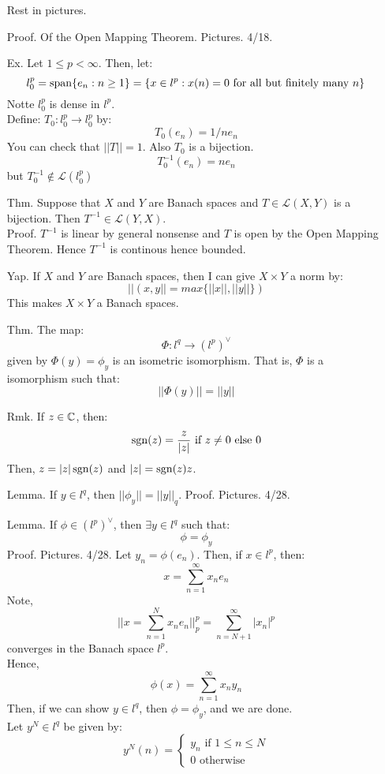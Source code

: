 \documentclass[12pt]{article}
\begin{document}
\begin{itemize}
    Rest in pictures.
    \item[Proof.] Of the Open Mapping Theorem. Pictures. 4/18.
    \item[Ex.] Let $1 \leq p < \infty$. Then, let: 
    \[ l_0^p = \operatorname{span}\{e_n : n \geq 1\} = \{x \in l^p: x(n) = 0 \text{ for all but finitely many $n$}\}\]
    Notte $l_0^p$ is dense in $l^p$. \\
    Define: $T_0: l_0^p \to l_0^p$ by:
    \[T_0(e_n) = 1/n e_n\]
    You can check that $||T|| = 1$. Also $T_0$ is a bijection. 
    \[T_0^{-1}(e_n) = ne_n\]
    but $T_0^{-1} \not\in \mathcal{L}(l_0^p)$
    \item[Thm.] Suppose that $X$ and $Y$ are Banach spaces and $T \in \mathcal{L}(X,Y)$ is a bijection. Then $T^{-1} \in \mathcal{L}(Y,X)$. \\
    Proof. $T^{-1}$ is linear by general nonsense and $T$ is open by the Open Mapping Theorem. Hence $T^{-1}$ is continous hence bounded.
    \item[Yap.] If $X$ and $Y$ are Banach spaces, then I can give $X \times Y$ a norm by: 
    \[ ||(x,y|| = max\{||x||, ||y||\})\]
    This makes $X \times Y$ a Banach spaces.
    \newpage 
    \item[Thm.] The map:
    \[ \Phi: l^q \to (l^p)^\vee \]
    given by $\Phi(y) = \phi_y$ is an isometric isomorphism. That is, $\Phi$ is a isomorphism such that:
    \[ ||\Phi(y)|| = ||y|| \]
    \item[Rmk.] If $z \in \mathbb C$, then: 
    \[ \operatorname{sgn}(z) = \frac{z}{|z|} \text{ if } z \neq 0 \text{ else } 0 \]
    Then, $z = |z| \operatorname{sgn}(z)$ and $|z| = \operatorname{sgn}(z) z$.
    \item[Lemma.] If $y \in l^q$, then $||\phi_y|| = ||y||_q$.   
    Proof. Pictures. 4/28.
    \item[Lemma.] If $\phi \in (l^p)^\vee$, then $\exists y \in l^q$ such that:
    \[ \phi = \phi_y\]
    Proof. Pictures. 4/28.
    Let $y_n = \phi(e_n)$. Then, if $x \in l^p$, then: 
    \[ x = \sum_{n=1}^\infty x_ne_n\]
    Note, 
    \[ || x = \sum_{n=1}^N x_n e_n||_p^p = \sum_{n=N+1}^\infty |x_n|^p \]
    converges in the Banach space $l^p$. \\
    Hence, 
    \[ \phi(x) = \sum_{n=1}^\infty x_ny_n \]
    Then, if we can show $y \in l^q$, then $\phi = \phi_y$, and we are done. \\
    Let $y^N \in l^q$ be given by:
    \[ y^N(n) = \begin{cases}
        y_n \text{ if } 1\leq n \leq N \\
        0 \text{ otherwise }
    \end{cases}\] 

\end{itemize}
\end{document}
